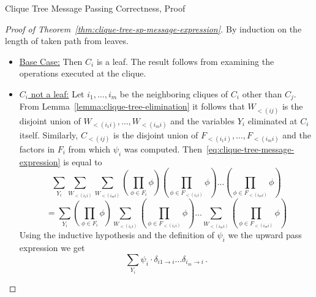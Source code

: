 \begin{frame}{Clique Tree Message Passing Correctness, Proof}
    \begin{proof}[Proof of Theorem~\ref{thm:clique-tree-sp-message-expression}]
        By induction on the length of taken path from leaves.
        \begin{itemize}
            \pause \item \underline{Base Case:}
            Then $C_i$ is a leaf. The result follows from examining the operations executed at the clique.
            \pause \item \underline{$C_i$ not a leaf:}
            Let $i_1,\ldots,i_m$ be the neighboring cliques of $C_i$ other than $C_j$.
            \pause
            From Lemma~\ref{lemma:clique-tree-elimination} it follows that $W_{<(ij)}$ is the disjoint union of $W_{<(i_1i)},\ldots,W_{<(i_mi)}$ and the variables $Y_i$ eliminated at $C_i$ itself.
            \pause
            Similarly, $C_{<(ij)}$ is the disjoint union of $F_{<(i_1i)},\ldots,F_{<(i_mi)}$ and the factors in $F_i$ from which $\psi_i$ was computed.
            \pause
            Then~\eqref{eq:clique-tree-message-expression} is equal to
            \begin{equation*}
               \sum_{Y_i} \sum_{W_{<(i_1i)}} \sum_{W_{<(i_mi)}} \left( \prod_{\phi \in F_i} \phi \right) \left(\prod_{\phi \in F_{<(i_1i)}} \phi \right) \dots \left(\prod_{\phi \in F_{<(i_mi)}} \phi \right) 
            \end{equation*}
            \pause
            \begin{equation}
               = \sum_{Y_i} \left(\prod_{\phi \in F_i} \phi \right) \sum_{W_{<(i_1i)}} \left(\prod_{\phi \in F_{<(i_1i)}} \phi \right) \dots \sum_{W_{<(i_mi)}}  \left(\prod_{\phi \in F_{<(i_mi)}} \phi \right) 
            \end{equation}
            \pause
            \vspace{-0.1cm}
            Using the inductive hypothesis and the definition of $\psi_i$ we the upward pass expression we get
            \begin{equation}
            \sum_{Y_i} \psi_i \cdot \delta_{i1 \rightarrow i} \dots \delta_{i_m \rightarrow i}\,.
            \end{equation}
        \end{itemize}
    \end{proof}
\end{frame}

